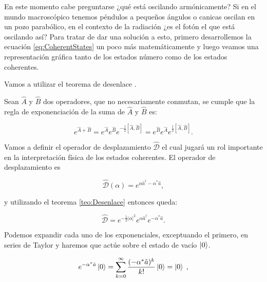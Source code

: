             En este momento cabe preguntarse ¿qué está oscilando armónicamente? Si en el mundo macroscópico tenemos péndulos a pequeños ángulos o canicas oscilan en un pozo parabólico, en el contexto de la radiación ¿es el fotón el que está oscilando así? Para tratar de dar una solución a esto, primero desarrollemos la ecuación \ref{eq:CoherentStates} un poco más matemáticamente y luego veamos una representación gráfica tanto de los estados número como de los estados coherentes.

            Vamos a utilizar el teorema de desenlace \cite{sakurai1995modern}.

            \begin{theorem*}\label{teo:Desenlace}
                Sean $\hat{A}$ y $\hat{B}$ dos operadores, que no necesariamente conmutan, se cumple que la regla de exponenciación de la suma de $\hat{A}$ y $\hat{B}$ es:

                \begin{equation}
                    e^{\hat{A} + \hat{B}} = e^{\hat{A}}e^{\hat{B}}e^{-\frac{1}{2}[\hat{A},\hat{B}]} = e^{\hat{B}}e^{\hat{A}}e^{\frac{1}{2}[\hat{A},\hat{B}]}.
                \end{equation}

            \end{theorem*}

            Vamos a definir el operador de desplazamiento $\hat{\mathcal{D}}$ el cual jugará un rol importante en la interpretación física de los estados coherentes. El operador de desplazamiento es

            \begin{equation}
                \hat{\mathcal{D}}(\alpha) = e^{\alpha\hat{a}^{\dagger} - \alpha^*\hat{a}},
            \end{equation}

            y utilizando el teorema \ref{teo:Desenlace} entonces queda:

            \begin{equation}
                \hat{\mathcal{D}} = e^{-\frac{1}{2}|\alpha|^2}e^{\alpha \hat{a}^{\dagger}}e^{-\alpha^*\hat{a}}.
            \end{equation}

            Podemos expandir cada uno de los exponenciales, exceptuando el primero, en series de Taylor y haremos que actúe sobre el estado de vacío $\ket{0}$.

            \begin{equation}
                e^{-\alpha^*\hat{a}} \ket{0} = \sum_{k=0}^{\infty}\frac{(-\alpha^*\hat{a})^k}{k!}\ket{0} = \ket{0}\;,
            \end{equation}

